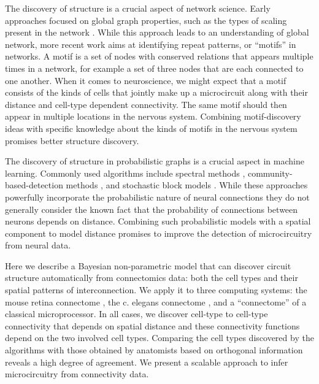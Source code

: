 \documentclass{article}
\begin{document}
The discovery of structure is a crucial aspect of network
science. Early approaches focused on global graph properties, such as
the types of scaling present in the network \autocite {WattsStrogatz1998}
.  While this approach leads to an understanding of global
network, more recent work aims at identifying repeat patterns, or
“motifs” in networks.  A motif is a set of nodes with conserved
relations that appears multiple times in a network, for example a set
of three nodes that are each connected to one another. When it comes
to neuroscience, we might expect that a motif consists of the kinds of
cells that jointly make up a microcircuit along with their distance
and cell-type dependent connectivity. The same motif should then
appear in multiple locations in the nervous system. Combining
motif-discovery ideas with specific knowledge about the kinds of
motifs in the nervous system promises better structure discovery.

The discovery of structure in probabilistic graphs is a crucial aspect
in machine learning. Commonly used algorithms include spectral methods
\autocite{}, community-based-detection methods \autocite{}, and stochastic block
models \autocite{NowickiSnijdders2001}. While these approaches powerfully incorporate the
probabilistic nature of neural connections \autocite{} they do not
generally consider the known fact that the probability of connections
between neurons depends on distance. Combining such probabilistic
models with a spatial component to model distance promises to improve
the detection of microcircuitry from neural data.

Here we describe a Bayesian non-parametric model that can discover
circuit structure automatically from connectomics data: both the cell
types and their spatial patterns of interconnection. We apply it to
three computing systems: the mouse retina connectome \autocite{}, the
c. elegans connectome \autocite{}, and a ``connectome'' of a classical
microprocessor. In all cases, we discover cell-type to cell-type
connectivity that depends on spatial distance and these connectivity
functions depend on the two involved cell types. Comparing the cell
types discovered by the algorithms with those obtained by anatomists
based on orthogonal information reveals a high degree of agreement. We
present a scalable approach to infer microcircuitry from connectivity
data.
\end{document}

